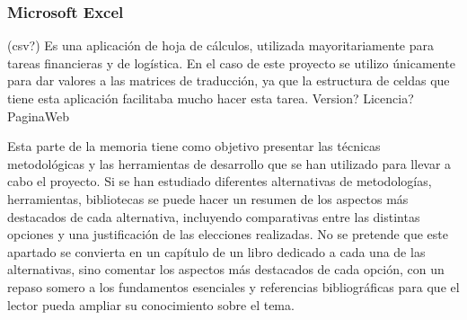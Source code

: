 \subsubsection{Microsoft Excel}
(csv?)
Es una aplicación de hoja de cálculos, utilizada mayoritariamente para tareas financieras y de logística. En el caso de este proyecto se utilizo únicamente para dar valores a las matrices de traducción, ya que la estructura de celdas que tiene esta aplicación facilitaba mucho hacer esta tarea.
Version? Licencia? PaginaWeb

Esta parte de la memoria tiene como objetivo presentar las técnicas metodológicas y las herramientas de desarrollo que se han utilizado para llevar a cabo el proyecto. Si se han estudiado diferentes alternativas de metodologías, herramientas, bibliotecas se puede hacer un resumen de los aspectos más destacados de cada alternativa, incluyendo comparativas entre las distintas opciones y una justificación de las elecciones realizadas. 
No se pretende que este apartado se convierta en un capítulo de un libro dedicado a cada una de las alternativas, sino comentar los aspectos más destacados de cada opción, con un repaso somero a los fundamentos esenciales y referencias bibliográficas para que el lector pueda ampliar su conocimiento sobre el tema.


